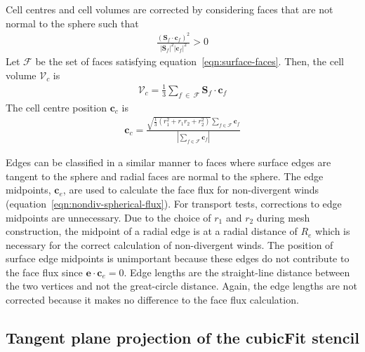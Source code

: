 Cell centres and cell volumes are corrected by considering faces that are not normal to the sphere such that
\begin{align}
	\frac{\left(\mathbf{S}_f \cdot \mathbf{c}_f\right)^2}{\left\lvert \mathbf{S}_f \right\rvert^2 \left\lvert \mathbf{c}_f \right\rvert^2} > 0 \label{eqn:surface-faces}
\end{align}
Let $\mathcal{F}$ be the set of faces satisfying equation~\eqref{eqn:surface-faces}.  Then, the cell volume $\mathcal{V}_c$ is
\begin{align}
	\mathcal{V}_c = \frac{1}{3} \sum_{f\:\in\:\mathcal{F}} \mathbf{S}_f \cdot \mathbf{c}_f
\end{align}
The cell centre position $\mathbf{c}_c$ is
\begin{align}
	\mathbf{c}_c = \frac{\sqrt{\frac{1}{3} \left(r_1^2 + r_1 r_2 + r_2^2\right)}\sum_{f\in\mathcal{F}} \mathbf{c}_f}{\left\lvert \sum_{f\in\mathcal{F}} \mathbf{c}_f \right\rvert}
\end{align}

Edges can be classified in a similar manner to faces where surface edges are tangent to the sphere and radial faces are normal to the sphere.  The edge midpoints, $\mathbf{c}_e$, are used to calculate the face flux for non-divergent winds (equation~\eqref{eqn:nondiv-spherical-flux}).
For transport tests, corrections to edge midpoints are unnecessary.  Due to the choice of $r_1$ and $r_2$ during mesh construction, the midpoint of a radial edge is at a radial distance of $R_e$ which is necessary for the correct calculation of non-divergent winds.
The position of surface edge midpoints is unimportant because these edges do not contribute to the face flux since $\mathbf{e} \cdot \mathbf{c}_e = 0$.
Edge lengths are the straight-line distance between the two vertices and not the great-circle distance.  Again, the edge lengths are not corrected because it makes no difference to the face flux calculation.

\subsection*{Tangent plane projection of the cubicFit stencil}
